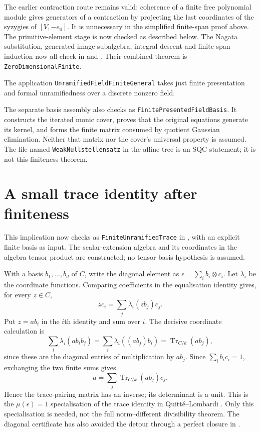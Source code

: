 \documentclass[11pt]{article}
\newcommand{\Tr}{\operatorname{Tr}}
\begin{document}
The earlier contraction route remains valid: coherence of a finite free
polynomial module gives generators of a contraction by projecting the
last coordinates of the syzygies of $[V,-e_0]$.  It is unnecessary in
the simplified finite-span proof above. The primitive-element stage is
now checked as described below. The Nagata substitution, generated
image subalgebra, integral descent and finite-span induction now all
check in  and
. Their combined theorem is
\texttt{ZeroDimensionalFinite}.

The application
\texttt{UnramifiedField\allowbreak FiniteGeneral} takes just finite presentation and
formal unramifiedness over a discrete nonzero field.

The separate basis assembly also checks as
\texttt{FinitePresented\allowbreak FieldBasis}. It constructs the iterated monic
cover, proves that the original equations generate its kernel, and
forms the finite matrix consumed by quotient Gaussian elimination.
Neither that matrix nor the cover's universal property is assumed.
The file named \texttt{WeakNullstellensatz} in the affine
tree is an SQC statement; it is not this finiteness theorem.

\section{A small trace identity after finiteness}

This implication now checks as \texttt{FiniteUnramifiedTrace} in
, with an explicit finite basis as input.
The scalar-extension algebra and its coordinates in the algebra tensor
product are constructed; no tensor-basis hypothesis is assumed.

With a basis $b_1,\ldots,b_d$ of $C$, write the diagonal element as
$\epsilon=\sum_i b_i\otimes c_i$.
Let $\lambda_i$ be the coordinate functions.  Comparing coefficients
in the equalisation identity gives, for every $z\in C$,
\[
 zc_i=\sum_j\lambda_i(zb_j)c_j.
\]
Put $z=ab_i$ in the $i$th identity and sum over $i$.  The decisive
coordinate calculation is
\[
 \sum_i\lambda_i(ab_i b_j)
   =\sum_i\lambda_i((ab_j)b_i)=\Tr_{C/k}(ab_j),
\]
since these are the diagonal entries of multiplication by $ab_j$.
Since $\sum_i b_i c_i=1$, exchanging the two finite sums gives
\[
 a=\sum_j\Tr_{C/k}(ab_j)c_j.
\]
Hence the trace-pairing matrix has an inverse; its determinant is a
unit.  This is the $\mu(\epsilon)=1$ specialisation of the trace
identity in Quitt\'e--Lombardi \cite[Theorem~3.1]{trace}.
Only this specialisation is needed, not the full norm--different
divisibility theorem.  The diagonal certificate has also avoided the
detour through a perfect closure in \cite[Theorem~4.3]{decisif}.
\end{document}
